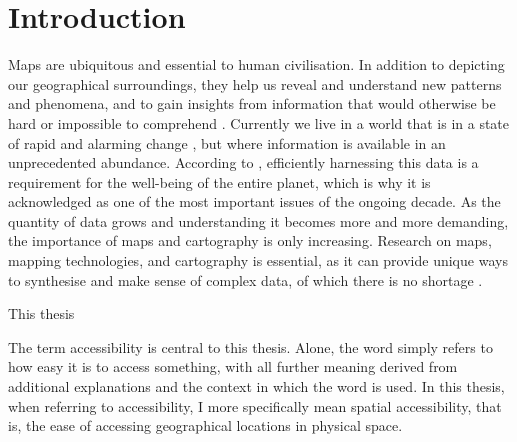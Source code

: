 \section{Introduction}



Maps are ubiquitous and essential to human civilisation.
In addition to depicting our geographical surroundings,
they help us reveal and understand new patterns and phenomena,
and to gain insights from information
that would otherwise be hard or impossible to comprehend \parencite{mac2004}.
Currently we live in a world that is in a state of rapid and
alarming change \parencite{un2023},
but where information is available in an unprecedented abundance.
According to \textcite{un2020}, efficiently harnessing this data
is a requirement for the well-being of the entire planet,
which is why it is acknowledged as
one of the most important issues of the ongoing decade.
As the quantity of data grows
and understanding it becomes more and more demanding,
the importance of maps and cartography is only increasing.
Research on maps, mapping technologies, and cartography is essential,
as it can provide unique ways to synthesise and make sense of complex data,
of which there is no shortage \parencite{kra2021}.



This thesis 


The term accessibility is central to this thesis.
Alone, the word simply refers to how easy it is to access something,
with all further meaning derived from
additional explanations and the context in which the word is used.
In this thesis, when referring to accessibility,
I more specifically mean spatial accessibility,
that is, the ease of accessing geographical locations in physical space.

